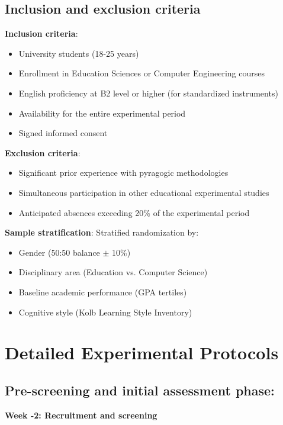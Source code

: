 \subsection{Inclusion and exclusion criteria}

\textbf{Inclusion criteria}:
\begin{itemize}
    \item University students (18-25 years)
    \item Enrollment in Education Sciences or Computer Engineering courses
    \item English proficiency at B2 level or higher (for standardized instruments)
    \item Availability for the entire experimental period
    \item Signed informed consent
\end{itemize}

\textbf{Exclusion criteria}:
\begin{itemize}
    \item Significant prior experience with pyragogic methodologies
    \item Simultaneous participation in other educational experimental studies
    \item Anticipated absences exceeding 20\% of the experimental period
\end{itemize}

\textbf{Sample stratification}: 
Stratified randomization by:
\begin{itemize}
    \item Gender (50:50 balance $\pm$ 10\%)
    \item Disciplinary area (Education vs. Computer Science)
    \item Baseline academic performance (GPA tertiles)
    \item Cognitive style (Kolb Learning Style Inventory)
\end{itemize}

\newpage

\section{Detailed Experimental Protocols}
\subsection*{Pre-screening and initial assessment phase:}

\textbf{Week -2: Recruitment and screening}

